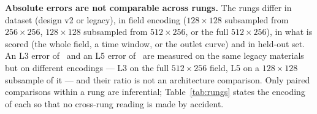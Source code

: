 \textbf{Absolute errors are not comparable across rungs.} The rungs differ in dataset
(design v2 or legacy), in field encoding (\(128\times128\) subsampled from
\(256\times256\), \(128\times128\) subsampled from \(512\times256\), or the full
\(512\times256\)), in what is scored (the whole field, a time window, or the outlet
curve) and in held-out set. An L3 error of \nLthreeMlpLarge\ and an L5 error of
\nLfiveONet\ are measured on the same legacy materials but on different encodings ---
L3 on the full \(512\times256\) field, L5 on a \(128\times128\) subsample of it --- and
their ratio is not an architecture comparison. Only paired comparisons within a rung are
inferential; Table~\ref{tab:rungs}
states the encoding of each so that no cross-rung reading is made by accident.

